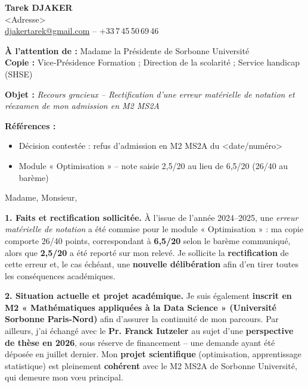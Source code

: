\documentclass[11pt,a4paper]{article}
\begin{document}
\begin{flushright}
\textbf{Tarek DJAKER}\\
<Adresse>\\
\href{mailto:djakertarek@gmail.com}{djakertarek@gmail.com} \;–\; +33\,7\,45\,50\,69\,46\\
\end{flushright}

\vspace{0.5cm}
\textbf{À l’attention de :} Madame la Présidente de Sorbonne Université\\
\textbf{Copie :} Vice‑Présidence Formation ; Direction de la scolarité ; Service handicap (SHSE)

\vspace{0.5cm}
\textbf{Objet :} \textit{Recours gracieux – Rectification d’une erreur matérielle de notation et réexamen de mon admission en M2 MS2A}

\vspace{0.3cm}
\textbf{Références :}
\begin{itemize}
  \item Décision contestée : refus d’admission en M2 MS2A du <date/numéro>
  \item Module « Optimisation » – note saisie 2,5/20 au lieu de 6,5/20 (26/40 au barème)
\end{itemize}

Madame, Monsieur,

\textbf{1. Faits et rectification sollicitée.}
À l’issue de l’année 2024–2025, une \textit{erreur matérielle de notation} a été commise pour le module « Optimisation » :
ma copie comporte 26/40 points, correspondant à \textbf{6,5/20} selon le barème communiqué, alors que \textbf{2,5/20} a été reporté
sur mon relevé. Je sollicite la \textbf{rectification} de cette erreur et, le cas échéant, une \textbf{nouvelle délibération} afin d’en tirer
toutes les conséquences académiques.

\textbf{2. Situation actuelle et projet académique.}
Je suis également \textbf{inscrit en M2 « Mathématiques appliquées à la Data Science » (Université Sorbonne Paris‑Nord)} afin
d’assurer la continuité de mon parcours. Par ailleurs, j’ai échangé avec le \textbf{Pr. Franck Iutzeler} au sujet d’une \textbf{perspective
de thèse en 2026}, sous réserve de financement – une demande ayant été déposée en juillet dernier.
Mon \textbf{projet scientifique} (optimisation, apprentissage statistique) est pleinement \textbf{cohérent} avec le M2 MS2A de Sorbonne
Université, qui demeure mon vœu principal.
\end{document}
